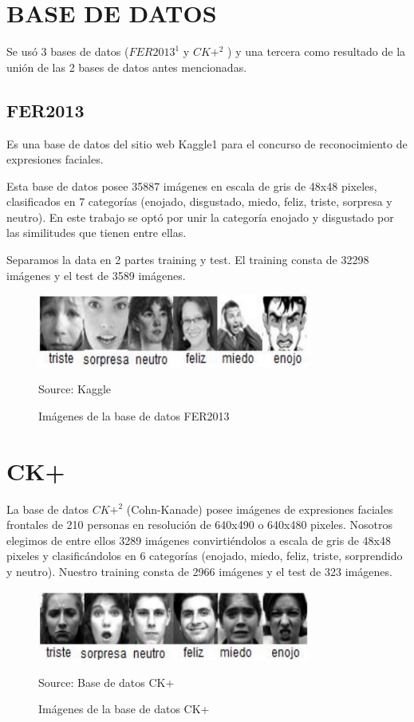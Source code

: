 \section{BASE DE DATOS}
Se usó 3 bases de datos ($FER2013^{1}$ y $CK+^{2}$ ) y una tercera como resultado de la
unión de las 2 bases de datos antes mencionadas.
\subsection{FER2013}
Es una base de datos del sitio web Kaggle{1} para el concurso de reconocimiento de
expresiones faciales.

Esta base de datos posee 35887 imágenes en escala de gris de 48x48 pixeles,
clasificados en 7 categorías (enojado, disgustado, miedo, feliz, triste, sorpresa y neutro).
En este trabajo se optó por unir la categoría enojado y disgustado por las similitudes que
tienen entre ellas.

Separamos la data en 2 partes training y test. El training consta de 32298 imágenes
y el test de 3589 imágenes.

\begin{figure}[H]
		\centering
		\includegraphics[width=90mm]{./Imagenes/imagenes_fer.png}
		\caption{Imágenes de la base de datos FER2013}
		Source: Kaggle
		\label{fig:imagenes_fer}
\end{figure}

\section{CK+}
La base de datos $CK+^{2}$ (Cohn-Kanade) posee imágenes de expresiones faciales
frontales de 210 personas en resolución de 640x490 o 640x480 pixeles. Nosotros
elegimos de entre ellos 3289 imágenes convirtiéndolos a escala de gris de 48x48 pixeles
y clasificándolos en 6 categorías (enojado, miedo, feliz, triste, sorprendido y neutro).
Nuestro training consta de 2966 imágenes y el test de 323 imágenes.

\begin{figure}[H]
		\centering
		\includegraphics[width=90mm]{./Imagenes/imagenes_ck+.png}
		\caption{Imágenes de la base de datos CK+}
		Source: Base de datos CK+
		\label{fig:imagenes_ck+}
\end{figure}


